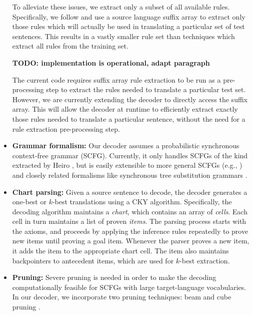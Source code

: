 \documentclass[11pt]{article}
\begin{document}
\begin{itemize}

To alleviate these issues, we extract only a subset of all available rules. Specifically, we follow  and use a source language suffix array to extract only those rules which will actually be used in translating a particular set of test sentences. This results in a vastly smaller rule set than techniques which extract all rules from the training set.

\textbf{TODO: implementation is operational, adapt paragraph}

The current code requires suffix array rule extraction to be run as a pre-processing step to extract the rules needed to translate a particular test set. However, we are currently extending the decoder to directly access the suffix array. This will allow the decoder at runtime to efficiently extract exactly those rules needed to translate a particular sentence, without the need for a rule extraction pre-processing step.

\item \textbf{Grammar formalism:} Our decoder assumes a probabilistic synchronous context-free grammar (SCFG). Currently, it only handles SCFGs of the kind extracted by Heiro \cite{Chiang2007}, but is easily extensible to more general SCFGs (e.g., \cite{Galley2006}) and closely related formalisms like synchronous tree substitution grammars \cite{Eisner2003}.

\item \textbf{Chart parsing:} Given a source sentence to decode, the decoder generates a one-best or $k$-best translations using a CKY algorithm. Specifically,
the decoding algorithm  maintains a \emph{chart}, which contains an array of \emph{cells}. Each cell in turn maintains a list of proven \emph{items}. The parsing process starts with the axioms, and proceeds by applying the inference rules repeatedly to prove new items until proving a goal item. Whenever the parser proves a new item, it adds the item to the appropriate chart cell. The item also maintains backpointers to antecedent items, which are used for $k$-best extraction.

\item \textbf{Pruning:} Severe pruning is needed in order to make the decoding computationally feasible for SCFGs with large target-language vocabularies. In our decoder, we incorporate two pruning techniques: beam and cube pruning \cite{Chiang2007}.


\end{itemize}
\end{document}
